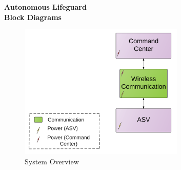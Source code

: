 \documentclass{article}
\begin{document}
 

\begin{center}
{\bf \Large Autonomous Lifeguard\\
	Block Diagrams}
\end{center}

\begin{figure}[H]
		\begin{center}
		\centerline{\includegraphics[width=0.7\textwidth]{image/davids_block_overview.png}}
		\caption{System Overview}
		\end{center}
	\end{figure}
\end{document}
